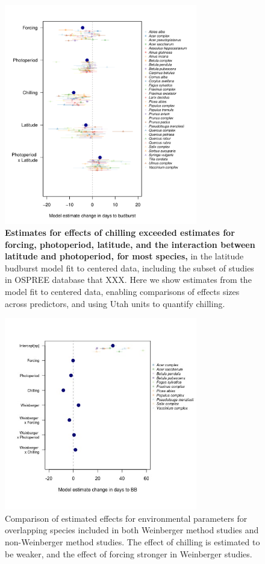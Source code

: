\documentclass{article}
\begin{document}
\newpage
\begin{figure}[h!]
\centering
\noindent \includegraphics[width=0.75\textwidth]{..//..//analyses/lat_analysis/figures/latanalysis_spcom_expramp_fp.pdf}
\caption{\textbf{Estimates for effects of chilling exceeded estimates for forcing, photoperiod, latitude, and the interaction between latitude and photoperiod, for most species,} in the latitude budburst model fit to centered data, including the subset of studies in OSPREE database that XXX. Here we show estimates from the model fit to centered data, enabling comparisons of effects sizes across predictors, and using Utah units to quantify chilling.}
\label{fig:lat}
\end{figure}
\newpage
\begin{figure}[h!]
\centering
\noindent \includegraphics[width=0.75\textwidth]{..//..//analyses/figures/weinberger_MU_4supp.jpeg}
\caption{Comparison of estimated effects for environmental parameters for overlapping species included in both Weinberger method studies and non-Weinberger method studies. The effect of chilling is estimated to be weaker, and the effect of forcing stronger in Weinberger studies.}
\label{fig:weinberger}
\end{figure}
\end{document}
